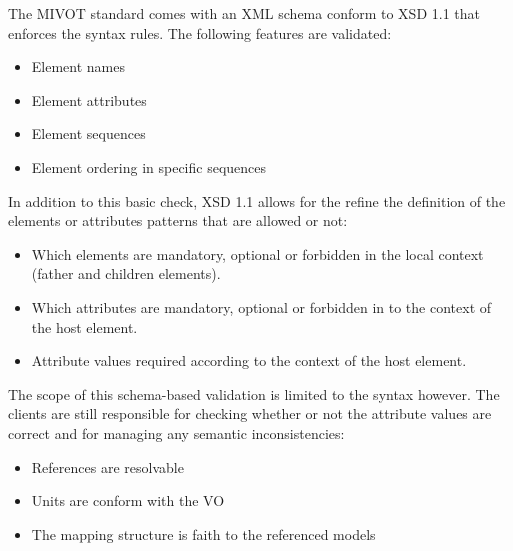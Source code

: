The MIVOT standard comes with an XML schema conform to XSD 1.1 \citep{std:xsd1.1} that enforces the syntax rules. 
The following features are validated:

\begin{itemize} 
  \item Element names 
  \item Element attributes
  \item Element sequences 
  \item Element ordering in specific sequences
\end{itemize}

In addition to this basic check, XSD 1.1 allows for the refine the definition of the elements or attributes  patterns that are allowed or not:

\begin{itemize} 
  \item Which elements are mandatory, optional  or forbidden in the local context  (father and children elements).
  \item Which attributes are mandatory, optional  or forbidden in to the context of the host element.
  \item Attribute values required according to the context of the host element.
\end{itemize}
 
The scope of this schema-based validation is limited to the syntax however. 
The clients are still responsible for checking whether or not the attribute values are correct and for managing any semantic inconsistencies:

\begin{itemize} 
  \item References are resolvable
  \item Units are conform with the VO
  \item The mapping structure is faith to the referenced models
\end{itemize}


